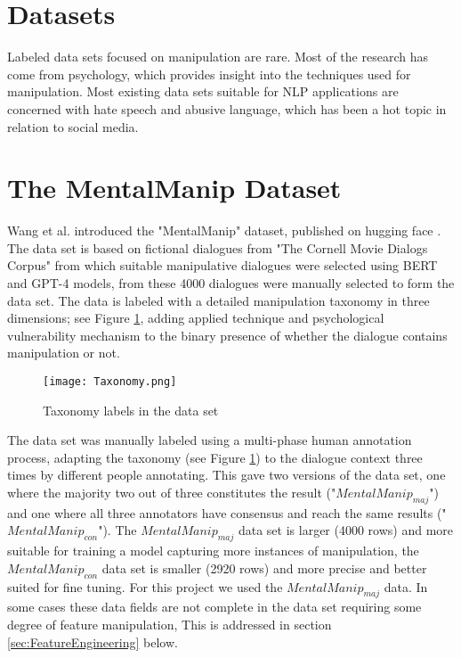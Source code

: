 \documentclass[
	letterpaper, %
	12pt, %
	unnumberedsections, %
	twoside, %
]{LTJournalArticle}
\begin{document}
\section{Datasets}
Labeled data sets focused on manipulation are rare. Most of the research has come from psychology, which provides insight into the techniques used for manipulation. Most existing data sets suitable for NLP applications are concerned with hate speech and abusive language, which has been a hot topic in relation to social media.

\section{The MentalManip Dataset}
Wang et al. \cite{MentalManip} introduced the "MentalManip" dataset, published on hugging face \cite{MentalManipDataset}. The data set is based on fictional dialogues from "The Cornell Movie Dialogs Corpus" \cite{CornellMovieCorpus} from which suitable manipulative dialogues were selected using BERT and GPT-4 models, from these 4000 dialogues were manually selected to form the data set. The data is labeled with a detailed manipulation taxonomy in three dimensions; see Figure \ref{fig:Taxonomy}, adding applied technique and psychological vulnerability mechanism to the binary presence of whether the dialogue contains manipulation or not.
\begin{figure}[!htp] %
	\centering
	\texttt{[image: Taxonomy.png]}
	\caption{Taxonomy labels in the data set}
	\label{fig:Taxonomy}
\end{figure}

The data set was manually labeled using a multi-phase human annotation process, adapting the taxonomy (see Figure \ref{fig:Taxonomy}) to the dialogue context three times by different people annotating. This gave two versions of the data set, one where the majority two out of three constitutes the result ("$MentalManip_{maj}$") and one where all three annotators have consensus and reach the same results ("$MentalManip_{con}$"). The $MentalManip_{maj}$ data set is larger (4000 rows) and more suitable for training a model capturing more instances of manipulation, the $MentalManip_{con}$ data set is smaller (2920 rows) and more precise and better suited for fine tuning. For this project we used the $MentalManip_{maj}$ data. In some cases these data fields are not complete in the data set requiring some degree of feature manipulation, This is addressed in section \ref{sec:FeatureEngineering} below.
\end{document}
